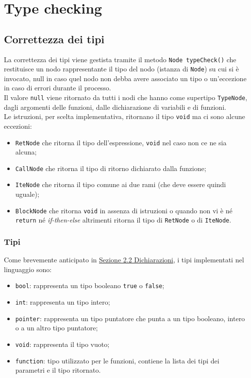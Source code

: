 \documentclass[../report.tex]{subfiles}
\begin{document}
\chapter{Type checking}\label{c:typechecking}
\section{Correttezza dei tipi}\label{s:correttezza-tipi}
La correttezza dei tipi viene gestista tramite il metodo \verb|Node typeCheck()| che restituisce un nodo rappresentante il tipo del nodo (istanza di \verb|Node|) su cui si è invocato, null in caso quel nodo non debba avere associato un tipo o  un'eccezione in caso di errori durante il processo.\\
Il valore \verb|null| viene ritornato da tutti i nodi che hanno come supertipo \verb|TypeNode|, dagli argomenti delle funzioni, dalle dichiarazione di variabili e di funzioni.\\
Le istruzioni, per scelta implementativa, ritornano il tipo \verb|void| ma ci sono alcune eccezioni:
\begin{itemize}
    \item \verb|RetNode| che ritorna il tipo dell'espressione, \verb|void| nel caso non ce ne sia alcuna;
    \item \verb|CallNode| che ritorna il tipo di ritorno dichiarato dalla funzione;
    \item \verb|IteNode| che ritorna il tipo comune ai due rami (che deve essere quindi uguale);
    \item \verb|BlockNode| che ritorna \verb|void| in assenza di istruzioni o quando non vi è n\'e \verb|return| n\'e \textit{if-then-else} altrimenti ritorna il tipo di \verb|RetNode| o di \verb|IteNode|. 
\end{itemize}
\subsection{Tipi}\label{s:tipi}
Come brevemente anticipato in \hyperref[s:dichiarazioni]{Sezione 2.2 Dichiarazioni}, i tipi implementati nel linguaggio sono:
\begin{itemize}
    \item \verb|bool|: rappresenta un tipo booleano \verb|true| o \verb|false|;
    \item \verb|int|: rappresenta un tipo intero;
    \item \verb|pointer|: rappresenta un tipo puntatore che punta a un tipo booleano, intero o a un altro tipo puntatore;
    \item \verb|void|: rappresenta il tipo vuoto;
    \item \verb|function|: tipo utilizzato per le funzioni, contiene la lista dei tipi dei parametri e il tipo ritornato.
\end{itemize}
\end{document}
